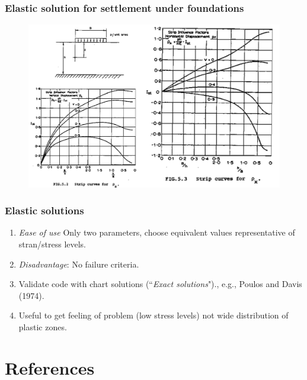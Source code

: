 \documentclass[notes]{beamer}
\begin{document}
\begin{frame}
	\frametitle{Elastic solution for settlement under foundations}
	\begin{figure}
		\includegraphics[width=\textwidth]{figs/elasticity-foundation.png}
	\end{figure}
\end{frame}

\begin{frame}
	\frametitle{Elastic solutions}
	\begin{enumerate}
		\item \textit{Ease of use} Only two parameters, choose equivalent values representative of stran/stress levels.
		\item \textit{Disadvantage}: No failure criteria.
		\item Validate code with chart solutions (``\textit{Exact solutions}")., e.g., Poulos and Davis (1974).
		\item Useful to get feeling of problem (low stress levels) not wide distribution of plastic zones.
	\end{enumerate}
\end{frame}


\section{References}
\end{document}
